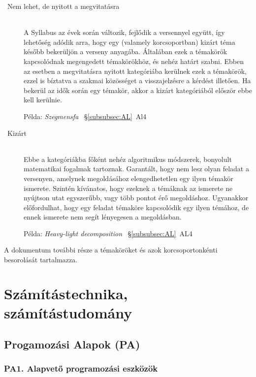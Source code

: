 \documentclass[a4paper,11pt,oneside]{article}
\newcommand{\xmark}{\ding{55}}%
\newcommand{\cemay}{{\small\xmark\faQuestionCircle}}
\newcommand{\cexcl}{{\small\xmark}}
\begin{document}
\begin{description}
\item[\cemay\ Nem lehet, de nyitott a megvitatásra]~\\
    A Syllabus az évek során változik, fejlődik a versennyel együtt, így lehetőség
    adódik arra, hogy egy (valamely korcsoportban) kizárt téma később bekerüljön
    a verseny anyagába. Általában ezek a témakörök kapcsolódnak megengedett témakörökhöz,
    és nehéz határt szabni. Ebben az esetben a megvitatásra nyitott kategóriába kerülnek
    ezek a témakörök, ezzel is bíztatva a szakmai közösséget a visszajelzésre a kérdést illetően.
    Ha bekerül az idők során egy témakör, akkor a kizárt kategóriából először ebbe kell kerülnie.
    
    Példa: \emph{Szegmensfa\/} ~\S\ref{subsubsec:AL}~Al4

\item[\cexcl\ Kizárt]~\\
    Ebbe a kategóriákba főként nehéz algoritmikus módszerek, bonyolult matematikai fogalmak
    tartoznak. Garantált, hogy nem lesz olyan feladat a versenyen, amelynek megoldásához
    elengedhetetlen egy ilyen témakör ismerete. Szintén kívánatos, hogy ezeknek a témáknak
    az ismerete ne nyújtson utat egyszerűbb, vagy több pontot érő megoldáshoz. Ugyanakkor
    előfordulhat, hogy egy feladat témaköre kapcsolódik egy ilyen témához, de ennek ismerete
    nem segít lényegesen a megoldásban.

    Példa: \emph{Heavy-light decomposition} ~\S\ref{subsubsec:AL}~AL4

\end{description}

\bigskip

\noindent
A dokumentum további része a témaköröket és azok korcsoportonkénti besorolását tartalmazza.


\section {Számítástechnika, számítástudomány} %
\label{subsec:computing-science}

\subsection {Progamozási Alapok (PA)} %
\label{subsubsec:PF}

\subsubsection*{PA1. Alapvető programozási eszközök} %
\end{document}

